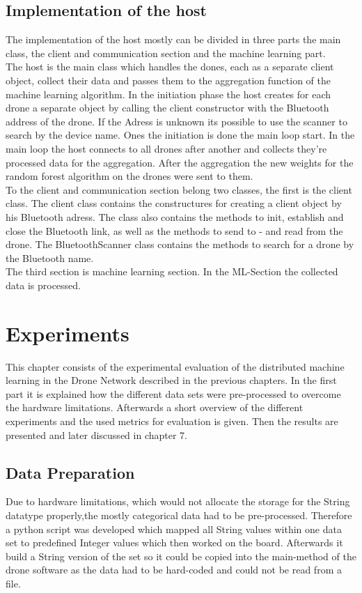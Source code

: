 \subsection{Implementation of the host}
The implementation of the host mostly can be divided in three parts the main class, the client and communication section and the machine learning part. \\
The host is the main class which handles the dones, each as a separate client object, collect their data and passes them to the aggregation function of the machine learning algorithm. In the initiation phase the host creates for each drone a separate object by calling the client constructor with the Bluetooth address of the drone. If the Adress is unknown its possible to use the scanner to search by the device name. Ones the initiation is done the main loop start. In the main loop the host connects to all drones after another and collects they’re processed data for the aggregation. After the aggregation the new weights for the random forest algorithm on the drones were sent to them. \\
To the client and communication section belong two classes, the first is the client class. The client class contains the constructures for creating a client object by his Bluetooth adress. The class also contains the methods to init, establish and close the Bluetooth link, as well as the methods to send to - and read from the drone.
The BluetoothScanner class contains the methods to search for a drone by the Bluetooth name. \\
The third section is machine learning section. In the ML-Section the collected data is processed.  


\section{Experiments}
This chapter consists of the experimental evaluation of the distributed machine learning in the Drone Network described in the previous chapters. In the first part it is explained how the different data sets were pre-processed to overcome the hardware limitations. Afterwards a short overview of the different experiments and the used metrics for evaluation is given. Then the results are presented and later discussed in chapter 7.

\subsection*{Data Preparation}
Due to hardware limitations, which would not allocate the storage for the String datatype properly,the mostly categorical data had to be pre-processed. Therefore a python script was developed which mapped all String values within one data set to predefined Integer values which then worked on the board. Afterwards it build a String version of the set so it could be copied into the main-method of the drone software as the data had to be hard-coded and could not be read from a file. 
